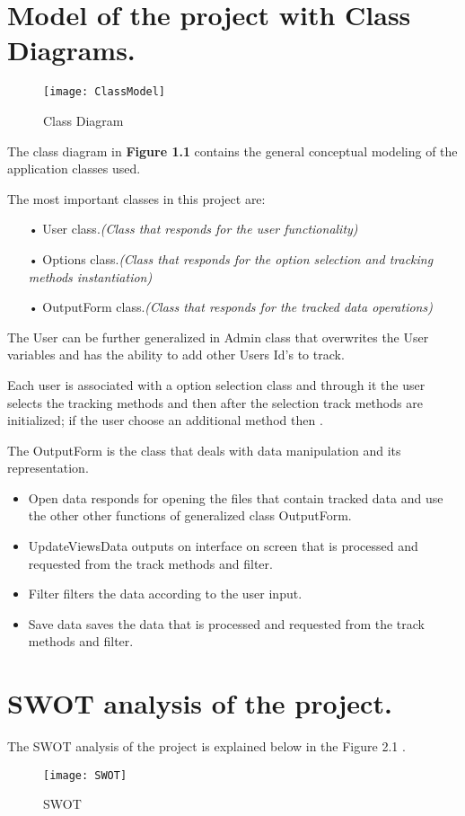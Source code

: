 
\setlength{\parindent}{2ex}
\section{Model of the project with Class Diagrams.}
\begin{figure}[h!]
	\centering
	\texttt{[image: ClassModel]}
	\caption{Class Diagram} 
\end{figure}
The class diagram in \textbf{Figure 1.1} contains the general conceptual modeling of the application classes used.
\par
The most important classes in this project are:
\begin{itemize}
\item[•] User class.\textit{(Class that responds for the user functionality)}
\item[•] Options class.\textit{(Class that responds for the option selection and tracking methods instantiation)}
\item[•] OutputForm class.\textit{(Class that responds for the tracked data operations)}
\end{itemize}
The User can be further generalized in Admin class that overwrites the User variables and has the ability to add other Users Id's to track.
\par
Each user is associated with a option selection class and through it the user selects the tracking methods and then after the selection track methods are initialized; if the user choose an additional method then .
\par
The OutputForm is the class that deals with data manipulation and its representation.
\begin{itemize}
\item Open data responds for opening the files that contain tracked data and use the other other functions of generalized class OutputForm. 
\item UpdateViewsData outputs on interface on screen that is processed and requested from the track methods and filter.
\item Filter filters the data according to the user input.
\item Save data saves the data that is processed and requested from the track methods and filter.
\end{itemize}



\section{SWOT analysis of the project.}
The SWOT analysis of the project is explained below in the Figure 2.1 .
\begin{figure}[h!]
	\centering
	\texttt{[image: SWOT]}
	\caption{SWOT} 
\end{figure}
\clearpage
